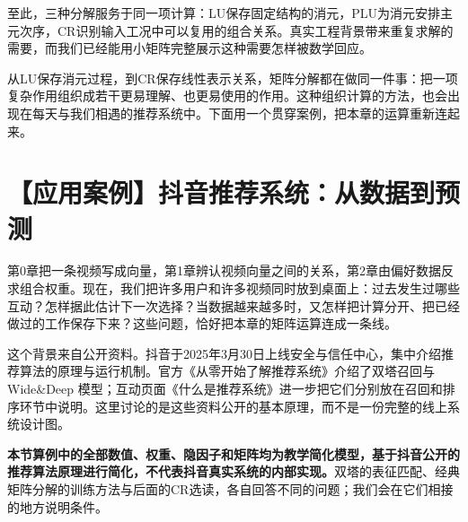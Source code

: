 \documentclass[a4paper,12pt,twoside,openany,fontset=none]{ctexbook}
\numberwithin{equation}{chapter}
\begin{document}
至此，三种分解服务于同一项计算：LU保存固定结构的消元，PLU为消元安排主元次序，CR识别输入工况中可以复用的组合关系。真实工程背景带来重复求解的需要，而我们已经能用小矩阵完整展示这种需要怎样被数学回应。


从LU保存消元过程，到CR保存线性表示关系，矩阵分解都在做同一件事：把一项复杂作用组织成若干更易理解、也更易使用的作用。这种组织计算的方法，也会出现在每天与我们相遇的推荐系统中。下面用一个贯穿案例，把本章的运算重新连起来。

\section{【应用案例】抖音推荐系统：从数据到预测}
\label{sec:three-douyin-case}

第0章把一条视频写成向量，第1章辨认视频向量之间的关系，第2章由偏好数据反求组合权重。现在，我们把许多用户和许多视频同时放到桌面上：过去发生过哪些互动？怎样据此估计下一次选择？当数据越来越多时，又怎样把计算分开、把已经做过的工作保存下来？这些问题，恰好把本章的矩阵运算连成一条线。

这个背景来自公开资料。抖音于2025年3月30日上线安全与信任中心，集中介绍推荐算法的原理与运行机制。官方《从零开始了解推荐系统》介绍了双塔召回与 Wide\&Deep 模型；互动页面《什么是推荐系统》进一步把它们分别放在召回和排序环节中说明。这里讨论的是这些资料公开的基本原理，而不是一份完整的线上系统\mbox{设计图。\cite{douyin-launch,douyin-models,douyin-recommendation}}

\textbf{本节算例中的全部数值、权重、隐因子和矩阵均为教学简化模型，基于抖音公开的推荐算法原理进行简化，不代表抖音真实系统的内部实现。}双塔的表征匹配、经典矩阵分解的训练方法与后面的CR选读，各自回答不同的问题；我们会在它们相接的地方说明条件。
\end{document}
